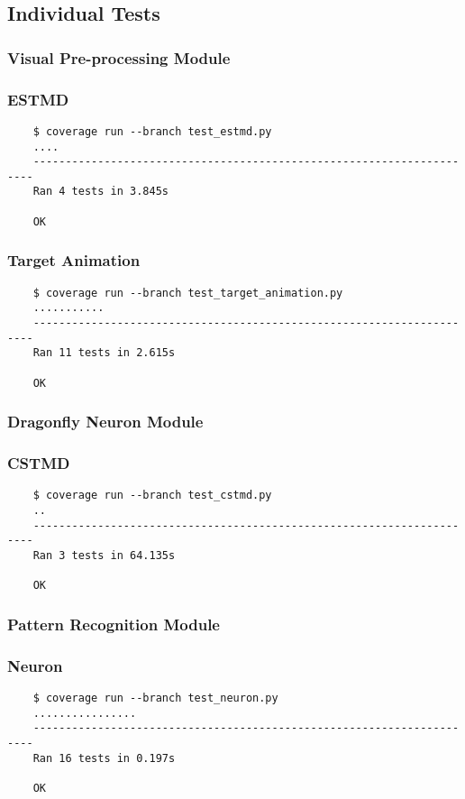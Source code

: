\documentclass[a4paper,11pt]{article}
\begin{document}
    
\subsection{Individual Tests}
\subsubsection{Visual Pre-processing Module}
\subsubsection*{{\hspace{6mm}}ESTMD}
\begin{verbatim}
    $ coverage run --branch test_estmd.py
    ....
    ----------------------------------------------------------------------
    Ran 4 tests in 3.845s

    OK
\end{verbatim}
\subsubsection*{{\hspace{6mm}}Target Animation}
\begin{verbatim}
    $ coverage run --branch test_target_animation.py
    ...........
    ----------------------------------------------------------------------
    Ran 11 tests in 2.615s

    OK
\end{verbatim}

\subsubsection{Dragonfly Neuron Module}
\subsubsection*{{\hspace{6mm}}CSTMD}
\begin{verbatim}
    $ coverage run --branch test_cstmd.py
    ..
    ----------------------------------------------------------------------
    Ran 3 tests in 64.135s

    OK
\end{verbatim}

\subsubsection{Pattern Recognition Module}
\subsubsection*{{\hspace{6mm}}Neuron}
\begin{verbatim}
    $ coverage run --branch test_neuron.py
    ................
    ----------------------------------------------------------------------
    Ran 16 tests in 0.197s

    OK
\end{verbatim}
\end{document}
